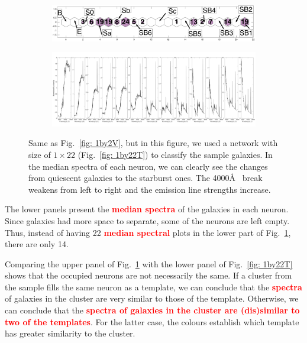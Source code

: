             \begin{figure}
                \begin{subfigure}[b]{\textwidth}
                    \includegraphics[width=\textwidth]{images0.01/1d/hit_v_1_by_22_n.png}
                    \centering
                \end{subfigure}
                \hfill
                \begin{subfigure}[b]{\textwidth}
                \centering
                     \includegraphics[width=\textwidth]{images0.01/1d/SED_total1by22_fluxdensity.png}
                \end{subfigure}
                \caption[Classification of fitted galaxy SEDs from \citet{Hossein12} using the $1\times22$~networks]{Same as Fig.~\ref{fig: 1by2V}, but in this figure, we used a network with size of $1\times22$ (Fig.~\ref{fig: 1by22T}) to classify the sample galaxies. In the median spectra of each neuron, we can clearly see the changes from quiescent galaxies to the starburst ones. The 4000\AA~ break weakens from left to right and the emission line strengths increase.}
                \label{fig: 1by22V}
            \end{figure}

            The lower panels present the \textbf{\textcolor{red}{median spectra}} of the galaxies in each neuron.
            Since galaxies had more space to separate, some of the neurons are left empty.
            Thus, instead of having 22 \textbf{\textcolor{red}{median spectral}} plots in the lower part of Fig.~\ref{fig: 1by22V}, there are only 14.
            
            Comparing the upper panel of Fig.~\ref{fig: 1by22V} with the lower panel of Fig.~\ref{fig: 1by22T} shows that the occupied neurons are not necessarily the same.
            If a cluster from the  sample fills the same neuron as a  template, we can conclude that the \textbf{\textcolor{red}{spectra}} of galaxies in the cluster are very similar to those of the template.
            Otherwise, we can conclude that the \textbf{\textcolor{red}{spectra of galaxies in the cluster are (dis)similar to two of the  templates}}.
            For the latter case, the colours establish which template has greater similarity to the  cluster.
            
